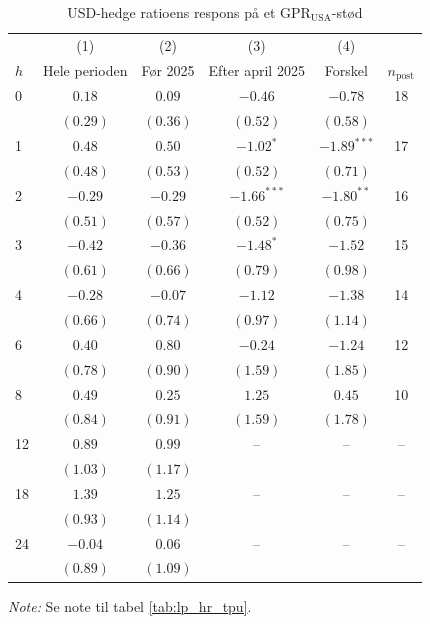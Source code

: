 \begin{table}[H]
\centering
\caption{USD-hedge ratioens respons på et $\text{GPR}_{\text{USA}}$-stød}
\label{tab:lp_hr_gpr_usa}
\begin{threeparttable}
\begin{tabular}{l cccc c}
\toprule
 & (1) & (2) & (3) & (4) & \\
$h$ & Hele perioden & Før 2025 & Efter april 2025 & Forskel & $n_{\text{post}}$ \\
\midrule
0 & $0.18$ & $0.09$ & $-0.46$ & $-0.78$ & 18 \\
 & $(0.29)$ & $(0.36)$ & $(0.52)$ & $(0.58)$ & \\[2pt]
1 & $0.48$ & $0.50$ & $-1.02^{*}$ & $-1.89^{***}$ & 17 \\
 & $(0.48)$ & $(0.53)$ & $(0.52)$ & $(0.71)$ & \\[2pt]
2 & $-0.29$ & $-0.29$ & $-1.66^{***}$ & $-1.80^{**}$ & 16 \\
 & $(0.51)$ & $(0.57)$ & $(0.52)$ & $(0.75)$ & \\[2pt]
3 & $-0.42$ & $-0.36$ & $-1.48^{*}$ & $-1.52$ & 15 \\
 & $(0.61)$ & $(0.66)$ & $(0.79)$ & $(0.98)$ & \\[2pt]
4 & $-0.28$ & $-0.07$ & $-1.12$ & $-1.38$ & 14 \\
 & $(0.66)$ & $(0.74)$ & $(0.97)$ & $(1.14)$ & \\[2pt]
6 & $0.40$ & $0.80$ & $-0.24$ & $-1.24$ & 12 \\
 & $(0.78)$ & $(0.90)$ & $(1.59)$ & $(1.85)$ & \\[2pt]
8 & $0.49$ & $0.25$ & $1.25$ & $0.45$ & 10 \\
 & $(0.84)$ & $(0.91)$ & $(1.59)$ & $(1.78)$ & \\[2pt]
12 & $0.89$ & $0.99$ & – & – & – \\
 & $(1.03)$ & $(1.17)$ &  &  & \\[2pt]
18 & $1.39$ & $1.25$ & – & – & – \\
 & $(0.93)$ & $(1.14)$ &  &  & \\[2pt]
24 & $-0.04$ & $0.06$ & – & – & – \\
 & $(0.89)$ & $(1.09)$ &  &  & \\[2pt]
\bottomrule
\end{tabular}
\begin{tablenotes}[flushleft]\footnotesize
\item \textit{Note:} Se note til tabel \ref{tab:lp_hr_tpu}.
\end{tablenotes}
\end{threeparttable}
\end{table}